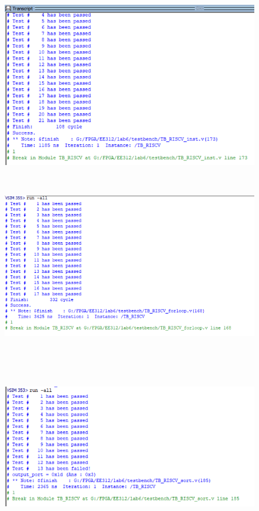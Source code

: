 \documentclass[12pt,a4paper]{article}
\begin{document}
\begin{figure}[H]
  \centering
  \includegraphics[height=3in]{inst.png}
  \end{figure}

\begin{figure}[H]
  \centering
  \includegraphics[height=3in]{forloop.png}
  \end{figure}

  \begin{figure}[H]
    \centering
    \includegraphics[height=3in]{sort.png}
    \end{figure}
\end{document}

